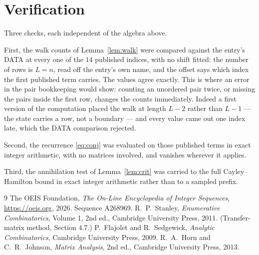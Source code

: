\documentclass[11pt,a4paper]{article}
\theoremstyle{plain}
\theoremstyle{definition}
\begin{document}
\section{Verification}

Three checks, each independent of the algebra above.

First, the walk counts of Lemma~\ref{lem:walk} were compared against the entry's DATA at
every one of the $14$ published indices, with no shift fitted: the number of rows is
$L=n$, read off the entry's own name, and the offset says which index the first
published term carries. The values agree exactly. This is where an error in the pair
bookkeeping would show: counting an unordered pair twice, or missing the pairs inside the
first row, changes the counts immediately. Indeed a first version of the computation
placed the walk at length $L-2$ rather than $L-1$ --- the state carries a row, not a
boundary --- and every value came out one index late, which the DATA comparison rejected.

Second, the recurrence \eqref{eq:conj} was evaluated on those published terms in exact
integer arithmetic, with no matrices involved, and vanishes wherever it applies.

Third, the annihilation test of Lemma~\ref{lem:crit} was carried to the full
Cayley--Hamilton bound in exact integer arithmetic rather than to a sampled prefix.

\begin{thebibliography}{9}
 The OEIS Foundation, \emph{The On-Line Encyclopedia of Integer
Sequences}, \url{https://oeis.org}, 2026. Sequence A268969.
 R.~P.~Stanley, \emph{Enumerative Combinatorics}, Volume 1, 2nd ed.,
Cambridge University Press, 2011. (Transfer-matrix method, Section 4.7.)
 P.~Flajolet and R.~Sedgewick, \emph{Analytic Combinatorics}, Cambridge
University Press, 2009.
 R.~A.~Horn and C.~R.~Johnson, \emph{Matrix Analysis}, 2nd ed., Cambridge
University Press, 2013.
\end{thebibliography}
\end{document}
